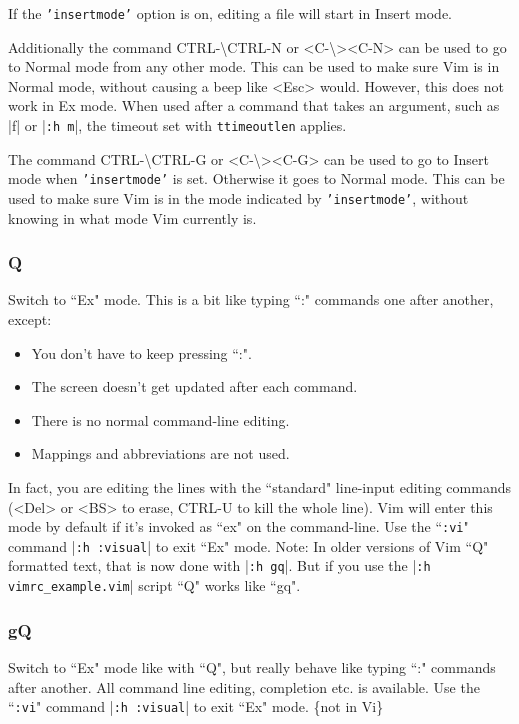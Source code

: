 If the \texttt{'insertmode'} option is on, editing a file will start in Insert mode.

\label{CTRL-backslash_CTRL-N}
\label{i_CTRL-backslash_CTRL-N}
\label{c_CTRL-backslash_CTRL-N}
\label{v_CTRL-backslash_CTRL-N}
Additionally the command CTRL-\textbackslash CTRL-N or <C-\textbackslash><C-N> can be used to go to Normal mode from any other mode.
This can be used to make sure Vim is in Normal mode, without causing a beep like <Esc> would.
However, this does not work in Ex mode.
When used after a command that takes an argument, such as |f| or |\texttt{:h m}|, the timeout set with \texttt{ttimeoutlen} applies.

\label{CTRL-backslash_CTRL-G}
\label{i_CTRL-backslash_CTRL-G}
\label{c_CTRL-backslash_CTRL-G}
\label{v_CTRL-backslash_CTRL-G}
The command CTRL-\textbackslash CTRL-G or <C-\textbackslash><C-G> can be used to go to Insert mode when \texttt{'insertmode'} is set.
Otherwise it goes to Normal mode.
This can be used to make sure Vim is in the mode indicated by \texttt{'insertmode'}, without knowing in what mode Vim currently is.

\subsubsection{Q}
\label{Q}
\label{mode-Ex}
\label{Ex-mode}
\label{Ex}
\label{EX}
\label{E501}
Switch to ``Ex" mode.
This is a bit like typing ``:" commands one after another, except:
\begin{itemize}
				\item You don't have to keep pressing ``:".
				\item The screen doesn't get updated after each command.
				\item There is no normal command-line editing.
				\item Mappings and abbreviations are not used.
\end{itemize}
In fact, you are editing the lines with the ``standard" line-input editing commands (<Del> or <BS> to erase, CTRL-U to kill the whole line).
Vim will enter this mode by default if it's invoked as ``ex" on the command-line.
Use the ``\texttt{:vi}" command |\texttt{:h :visual}| to exit ``Ex" mode.
Note: In older versions of Vim ``Q" formatted text, that is now done with |\texttt{:h gq}|.
But if you use the
|\texttt{:h vimrc\_example.vim}| script ``Q" works like ``gq".

\subsubsection{gQ}
\label{gQ}
Switch to ``Ex" mode like with ``Q", but really behave like typing ``:" commands after another.
All command line editing, completion etc. is available.
Use the ``\texttt{:vi}" command |\texttt{:h :visual}| to exit ``Ex" mode.
\{not in Vi\}

